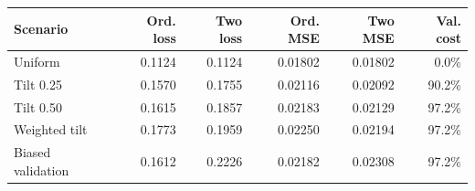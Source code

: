 \begin{tabular}{lrrrrr}
\toprule
Scenario & Ord. loss & Two loss & Ord. MSE & Two MSE & Val. cost \\
\midrule
Uniform & 0.1124 & 0.1124 & 0.01802 & 0.01802 & 0.0\% \\
Tilt 0.25 & 0.1570 & 0.1755 & 0.02116 & 0.02092 & 90.2\% \\
Tilt 0.50 & 0.1615 & 0.1857 & 0.02183 & 0.02129 & 97.2\% \\
Weighted tilt & 0.1773 & 0.1959 & 0.02250 & 0.02194 & 97.2\% \\
Biased validation & 0.1612 & 0.2226 & 0.02182 & 0.02308 & 97.2\% \\
\bottomrule
\end{tabular}

